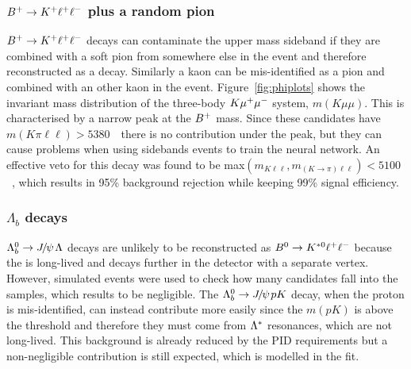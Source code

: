 \subsubsection{${{B}^+} \rightarrow K^+ \ell^+ \ell^-$ plus a random pion}

${{B}^+} \rightarrow K^+ \ell^+ \ell^-$ decays can contaminate the upper \Bz mass sideband if they are combined
with a soft pion from somewhere else in the event and therefore reconstructed as a \Bz decay.
Similarly a kaon can be mis-identified as a pion and combined with an other kaon in the event.
Figure~\ref{fig:phiplots} shows the invariant mass distribution of the three-body $K{\mu^+\mu^-}$ system,
$m(K\mu\mu)$. This is characterised by a narrow peak at the ${{B}^+}$ mass. Since these
candidates have $m(K\pi\ell\ell) > 5380$~\mevcc~there is no contribution under the \Bz peak,
but they can cause problems when using sidebands events to train the neural network.
An effective veto for this decay was found to be max$(m_{K\ell\ell},m_{(K\to\pi)\ell\ell}) < 5100$~\mevcc,
which results in 95\% background rejection while keeping 99\% signal efficiency.

\subsubsection{$\Lambda_b$ decays}

$\Lb\to\jpsi\Lz$ decays are unlikely to be reconstructed as ${{B}^0} \rightarrow {\ensuremath{{K}^{*0}}} \ell^+ \ell^-$ because
the \Lz is long-lived and decays further in the detector with a separate vertex.
However, simulated events were used to check how many candidates fall into the \Bz samples, which results to be negligible. 
The $\Lb\to\jpsi pK$ decay, when the proton is mis-identified, can instead contribute more easily since the $m(pK)$ is above the \Lz threshold
and therefore they must come from ${\Lambda}^*$ resonances, which are not long-lived. This background is already
reduced by the PID requirements but a non-negligible contribution is still expected, 
which is modelled in the fit.

\subsubsection{ }

